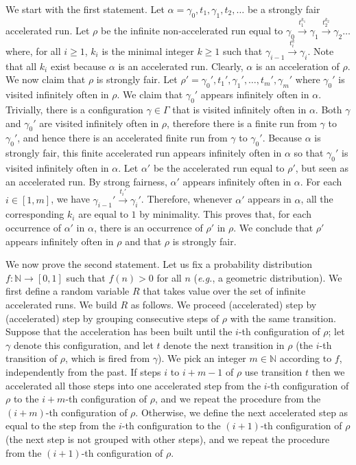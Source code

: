\documentclass[10pt,a4paper]{article}
\let\mathbb\mathds
\renewcommand{\geq}{\geqslant}
\newcommand{\nats}{\mathbb{N}}
\newcommand{\nset}[2]{[#1,#2]}
\newcommand{\accrun}{\alpha}
\newcommand{\config}{\gamma}
\newcommand{\configs}{\Gamma}
\newcommand{\step}[1]{\xrightarrow{#1}}
\newcommand{\run}{\rho}
\newcommand*{\atrans}{t}
\begin{document}
\begin{appendixproof}
	We start with the first statement.
	Let \(\accrun = \config_0, \atrans_1, \config_1, \atrans_2, \dots\) be a strongly fair accelerated run.
	Let \(\run\) be the infinite non-accelerated run equal to \(\config_0 \step{t_1^{k_1}} \config_1 \step{t_2^{k_2}} \config_2 \dots\) where, for all \(i \geq 1\), \(k_i\) is the minimal integer \(k \geq 1\) such that \(\config_{i-1} \step{t_i^k} \config_i\).
	Note that all \(k_i\) exist because \(\accrun\) is an accelerated run.
	Clearly, \(\accrun\) is an acceleration of \(\run\).
	We now claim that \(\run\) is strongly fair.
	Let \(\run' = \config_0', \atrans_1', \config_1', \dots, \atrans_m', \config_m'\) where \(\config_0'\) is visited infinitely often in \(\run\).
	We claim that \(\config_0'\) appears infinitely often in \(\accrun\).
	Trivially, there is a configuration \(\config \in \configs\) that is visited infinitely often in \(\accrun\).
	Both \(\config\) and \(\config_0'\) are visited infinitely often in \(\run\), therefore there is a finite run from \(\config\) to \(\config_0'\), and hence there is an accelerated finite run from \(\config\) to \(\config_0'\).
	Because \(\accrun\) is strongly fair, this finite accelerated run appears infinitely often in \(\accrun\) so that \(\config_0'\) is visited infinitely often in \(\accrun\).
	Let \(\accrun'\) be the accelerated run equal to \(\run'\), but seen as an accelerated run.
	By strong fairness, \(\accrun'\) appears infinitely often in \(\accrun\).
	For each \(i \in \nset{1}{m}\), we have \(\config_{i-1}' \step{\atrans_i'} \config_i'\).
	Therefore, whenever \(\accrun'\) appears in \(\accrun\), all the corresponding \(k_i\) are equal to \(1\) by minimality.
	This proves that, for each occurrence of \(\accrun'\) in \(\accrun\), there is an occurrence of \(\run'\) in \(\run\).
	We conclude that \(\run'\) appears infinitely often in \(\run\) and that \(\run\) is strongly fair.

	We now prove the second statement.
	Let us fix a probability distribution \(f: \nats \to [0,1]\) such that \(f(n) > 0\) for all \(n\) (\emph{e.g.}, a geometric distribution).
	We first define a random variable \(R\) that takes value over the set of infinite accelerated runs.
	We build \(R\) as follows.
	We proceed (accelerated) step by (accelerated) step by grouping consecutive steps of \(\run\) with the same transition.
	Suppose that the acceleration has been built until the \(i\)-th configuration of \(\run\); let \(\config\) denote this configuration, and let \(t\) denote the next transition in \(\run\) (the \(i\)-th transition of \(\run\), which is fired from \(\config\)).
	We pick an integer \(m \in \nats\) according to \(f\), independently from the past.
	If steps \(i\) to \(i+m-1\) of \(\run\) use transition \(t\) then we accelerated all those steps into one accelerated step from the \(i\)-th configuration of \(\run\) to the \(i+m\)-th configuration of \(\run\), and we repeat the procedure from the \((i+m)\)-th configuration of \(\run\).
	Otherwise, we define the next accelerated step as equal to the step from the \(i\)-th configuration to the \((i+1)\)-th configuration of \(\run\) (the next step is not grouped with other steps), and we repeat the procedure from the \((i+1)\)-th configuration of \(\run\).


\end{appendixproof}
\end{document}
